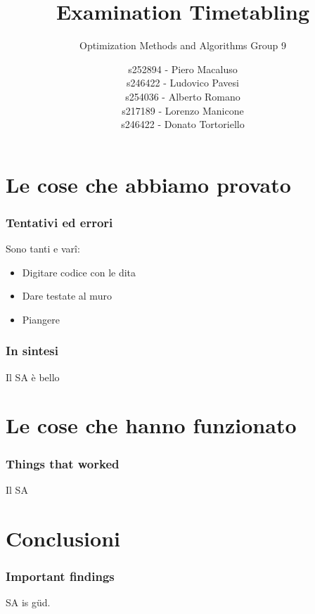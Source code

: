 \documentclass{beamer}
\title{Examination Timetabling} %
\subtitle{Optimization Methods and Algorithms Group 9} %
\author{s252894 - Piero Macaluso\\s246422 - Ludovico Pavesi\\s254036 - Alberto Romano\\s217189 - Lorenzo Manicone\\s246422 - Donato Tortoriello}
\begin{document}
  \frame{\maketitle}


   \section{Le cose che abbiamo provato}
   
   \begin{frame}
   \frametitle{Tentativi ed errori}
   Sono tanti e var\^i:
   \begin{itemize}
   	\item Digitare codice con le dita
   	\item Dare testate al muro
   	\item Piangere
   \end{itemize}
\end{frame}

\begin{frame}
\frametitle{In sintesi}
Il SA è bello
\end{frame}

\section{Le cose che hanno funzionato}

\begin{frame}
\frametitle{Things that worked}
Il SA
\end{frame}

\section{Conclusioni}

\begin{frame}
\frametitle{Important findings}
SA is g\"ud.
\end{frame}
\end{document}
